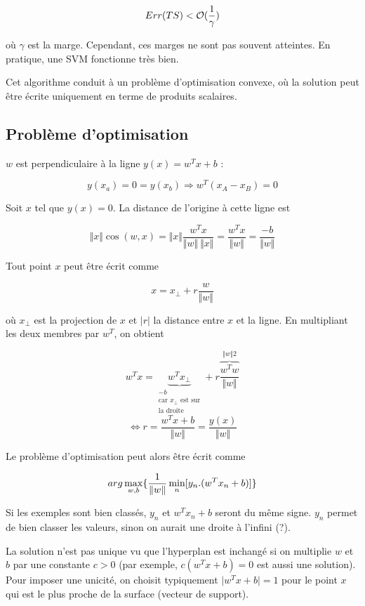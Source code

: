 	$$Err(TS) < \mathcal{O} (\frac{1}{\gamma})$$
	
	où $\gamma$ est la marge. Cependant, ces marges ne sont pas souvent atteintes. En pratique, une SVM fonctionne très bien.
	
	Cet algorithme conduit à un problème d'optimisation convexe, où la solution peut être écrite uniquement en terme de produits scalaires.
	
	\subsection{Problème d'optimisation}
	
	
	$w$ est perpendiculaire à la ligne $y(x) = w^Tx + b$ :
	
	$$y(x_a) = 0 = y(x_b) \Rightarrow w^T(x_A - x_B) = 0$$
	
	Soit $x$ tel que $y(x) = 0$. La distance de l'origine à cette ligne est
	
	$$\Vert x \Vert \cos(w, x) = \Vert x \Vert \frac{w^T x}{\Vert w \Vert \: \Vert x \Vert} = \frac{w^Tx}{\Vert w \Vert} = \frac{-b}{\Vert w \Vert}$$
	
	Tout point $x$ peut être écrit comme
	
	$$x = x_{\perp} + r \frac{w}{\Vert w \Vert}$$
	
	où $x_{\perp}$ est la projection de $x$ et $\vert r \vert$ la distance entre $x$ et la ligne. En multipliant les deux membres par $w^T$, on obtient
	
	$$w^Tx = \underbrace{w^T x_{\perp}}_{\substack{-b\\ \text{car } x_{\perp} \text{ est sur} \\ \text{la droite}}} + r \frac{\overbrace{w^T w}^{\Vert w \Vert2}}{\Vert w \Vert}$$
	$$\Leftrightarrow r = \frac{w^Tx + b}{\Vert w \Vert} = \frac{y(x)}{\Vert w \Vert}$$
	
	Le problème d'optimisation peut alors être écrit comme 
	
	$$arg \max_{w, b} \lbrace \frac{1}{\Vert w \Vert} \min_n [y_n . (w^T x_n + b)] \rbrace$$
	
	Si les exemples sont bien classés, $y_n$ et $w^Tx_n + b$ seront du même signe. $y_n$ permet de bien classer les valeurs, sinon on aurait une droite à l'infini (?).
	
	La solution n'est pas unique vu que l'hyperplan est inchangé si  on multiplie $w$ et $b$ par une constante $c > 0$ (par exemple, $c (w^Tx + b) = 0$ est aussi une solution). Pour imposer une unicité, on choisit typiquement $\vert w^T x + b \vert = 1$ pour le point $x$ qui est le plus proche de la surface (vecteur de support).
	
